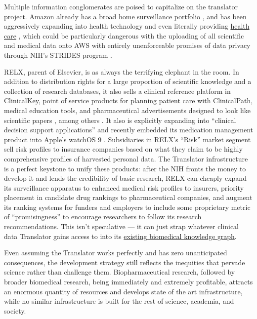 Multiple information conglomerates are poised to capitalize on the
translator project. Amazon already has a broad home surveillance
portfolio \citep{bridgesAmazonRingLargest2021} , and has been
aggressively expanding into health technology \citep{AWSAnnouncesAWS2021}  and even literally providing
\href{https://amazon.care/}{health care} \citep{lermanAmazonBuiltIts2021} , which could be particularly dangerous
with the uploading of all scientific and medical data onto AWS with
entirely unenforceable promises of data privacy through NIH's STRIDES
program \citep{quinnYouCanTrust2021} .

RELX, parent of Elsevier, is as always the terrifying elephant in the
room. In addition to distribution rights for a large proportion of
scientific knowledge and a collection of research databases, it also
sells a clinical reference platform in ClinicalKey, point of service
products for planning patient care with ClinicalPath, medical education
tools, and pharmaceutical advertisements designed to look like
scientific papers \citep{elsevier360AdvertisingSolutions} , among
others \citep{relx2021AnnualReport2021} . It also is explicitly
expanding into ``clinical decision support applications'' \citep{relx2021AnnualReport2021}  and recently embedded its medication
management product into Apple's watchOS 9 \citep{appleWatchOSDeliversNew2022} . Subsidiaries in RELX's ``Risk'' market
segment sell risk profiles to insurance companies based on what they
claim to be highly comprehensive profiles of harvested personal data.
The Translator infrastructure is a perfect keystone to unify these
products: after the NIH fronts the money to develop it and lends the
credibility of basic research, RELX can cheaply expand its surveillance
apparatus to enhanced medical risk profiles to insurers, priority
placement in candidate drug rankings to pharmaceutical companies, and
augment its ranking systems for funders and employers to include some
proprietary metric of ``promisingness'' to encourage researchers to
follow its research recommendations. This isn't speculative --- it can
just strap whatever clinical data Translator gains access to into its
\href{https://www.elsevier.com/solutions/biology-knowledge-graph}{existing
biomedical knowledge graph}.

Even assuming the Translator works perfectly and has zero unanticipated
consequences, the development strategy still reflects the inequities
that pervade science rather than challenge them. Biopharmaceutical
research, followed by broader biomedical research, being immediately and
extremely profitable, attracts an enormous quantity of resources and
develops state of the art infrastructure, while no similar
infrastructure is built for the rest of science, academia, and society.

